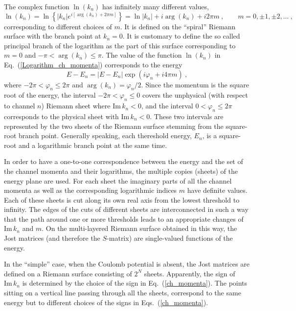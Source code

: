 \documentclass[12pt]{article}
\begin{document}
The complex function $\ln(k_n)$ has infinitely many different values,
\begin{equation}
\label{Logarithm_ch_momenta}
   \ln(k_n)=\ln\left\{|k_n|e^{i[\arg(k_n)+2\pi m]}\right\}=
   \ln|k_n|+i\arg(k_n)+i2\pi m\ ,
   \qquad  m=0,\pm1,\pm2,\dots\ ,
\end{equation}
corresponding to different choices of $m$. It is defined on the ``spiral'' 
Riemann surface with the branch point at $k_n=0$. It is customary to define the 
so called principal branch of the logarithm as the part of this surface 
corresponding to $m=0$ and $-\pi<\arg(k_n)\leqslant\pi$. The value of the 
function $\ln(k_n)$ in Eq.~(\ref{Logarithm_ch_momenta}) corresponds to the 
energy
\begin{equation}
\label{E4pi}
      E-E_n=|E-E_n|\exp(i\varphi_n+i4\pi m)\ ,
\end{equation}
where $-2\pi<\varphi_n\leqslant 2\pi$ and $\arg(k_n)=\varphi_n/2$. Since the 
momentum is the square root of the energy, the interval 
$-2\pi<\varphi_n\leqslant 0$ covers the unphysical (with respect to channel $n$) 
Riemann sheet where $\mathrm{Im}\,k_n<0$, and the interval $0<\varphi_n\leqslant 
2\pi$ corresponds to the physical sheet with $\mathrm{Im}\,k_n<0$. These two 
intervals are represented by the two sheets of the Riemann surface stemming from 
the square-root branch point. Generally speaking, each thereshold energy, $E_n$, 
is a square-root and a logarithmic branch point at the same time.

In order to have a one-to-one correspondence between the energy and the set of 
the channel momenta and their logarithms, the multiple copies (sheets) of the 
energy plane are 
used. For each sheet the imaginary parts of all the channel momenta as well as 
the corresponding logarithmic indices $m$ have definite values. Each of these 
sheets is cut along its own real axis from the lowest threshold to infinity. The 
edges of the cuts of different sheets are interconnected in such a way that the 
path around one or more thresholds leads to an appropriate changes of 
$\mathrm{Im}\,k_n$ and $m$. On the multi-layered Riemann surface obtained in 
this way, the Jost matrices (and therefore the $S$-matrix) are single-valued 
functions of the energy.

In the ``simple'' case, when the Coulomb potential is absent, the Jost matrices
are defined on a Riemann surface consisting of $2^N$ sheets.
 Apparently, the sign of $\mathrm{Im}\,k_n$ is determined by the choice of the 
sign in Eq.~(\ref{ch_momenta}). The points sitting on a vertical line passing 
through all the sheets, correspond to the same energy but to different choices 
of the signs in Eqs.~(\ref{ch_momenta}).
\end{document}
